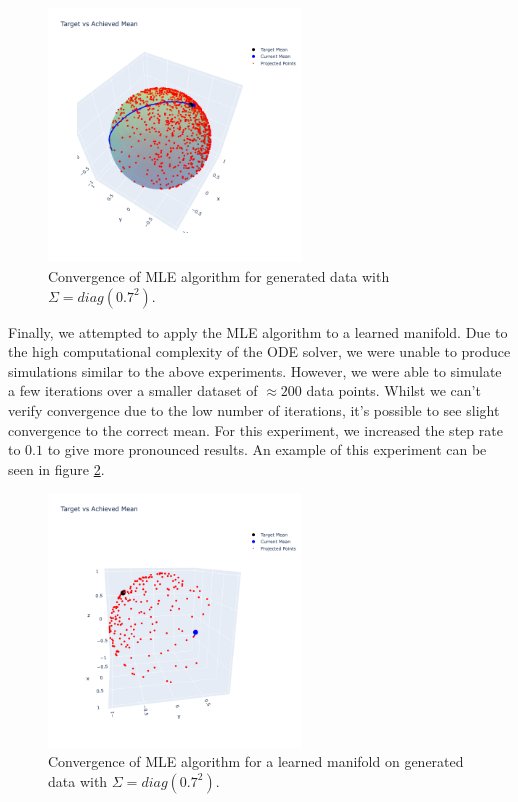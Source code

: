 \documentclass{article}
\begin{document}
\begin{figure}[h]
    \centering
    \includegraphics[width=0.6\textwidth]{plots/high_cov_with_proj.png}
    \caption{Convergence of MLE algorithm for generated data with $\Sigma=diag(0.7^2)$.}
    \label{fig:high_convergence}
\end{figure}

Finally, we attempted to apply the MLE algorithm to a learned manifold. Due to the high computational complexity of the ODE solver, we were unable to produce simulations similar to the above experiments. However, we were able to simulate a few iterations over a smaller dataset of $\approx 200$ data points. Whilst we can't verify convergence due to the low number of iterations, it's possible to see slight convergence to the correct mean. For this experiment, we increased the step rate to $0.1$ to give more pronounced results. An example of this experiment can be seen in figure \ref{fig:learned_mean}.

\begin{figure}[h]
    \centering
    \includegraphics[width=0.6\textwidth]{plots/learned_mean.png}
    \caption{Convergence of MLE algorithm for a learned manifold on generated data with $\Sigma=diag(0.7^2)$.}
    \label{fig:learned_mean}
\end{figure}
\end{document}
